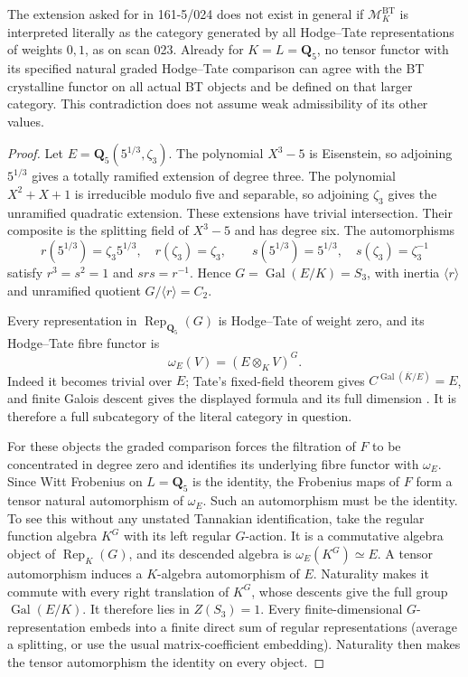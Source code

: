 \begin{theorem}\label{cat:J8}
The extension asked for in 161-5/024 does not exist in general if
$\mathcal M_K^{\mathrm{BT}}$ is interpreted literally as the category
generated by all Hodge--Tate representations of weights $0,1$, as on
scan 023.  Already for $K=L=\mathbf Q_5$, no tensor functor with its
specified natural graded Hodge--Tate comparison can agree with the
BT crystalline functor on all actual BT objects and be defined on
that larger category.  This contradiction does not assume weak
admissibility of its other values.
\end{theorem}
\begin{proof}
Let $E=\mathbf Q_5(5^{1/3},\zeta_3)$.  The polynomial $X^3-5$ is
Eisenstein, so adjoining $5^{1/3}$ gives a totally ramified extension
of degree three.  The polynomial $X^2+X+1$ is irreducible modulo five
and separable, so adjoining $\zeta_3$ gives the unramified quadratic
extension.  These extensions have trivial intersection.  Their
composite is the splitting field of $X^3-5$ and has degree six.
The automorphisms
\[
 r(5^{1/3})=\zeta_3 5^{1/3},\quad r(\zeta_3)=\zeta_3,
 \qquad
 s(5^{1/3})=5^{1/3},\quad s(\zeta_3)=\zeta_3^{-1}
\]
satisfy $r^3=s^2=1$ and $srs=r^{-1}$.  Hence
$G=\operatorname{Gal}(E/K)=S_3$, with inertia $\langle r\rangle$ and
unramified quotient $G/\langle r\rangle=C_2$.

Every representation in $\operatorname{Rep}_{\mathbf Q_5}(G)$ is
Hodge--Tate of weight zero, and its Hodge--Tate fibre functor is
\[
 \omega_E(V)=(E\otimes_KV)^G.
\]
Indeed it becomes trivial over $E$; Tate's fixed-field theorem gives
$C^{\operatorname{Gal}(\overline K/E)}=E$, and finite Galois descent
gives the displayed formula and its full dimension
\cite[main Theorem, p.~417; proof in \S3]{catAx1970}.
It is therefore a full subcategory of the literal category in question.

For these objects the graded comparison forces the filtration of $F$
to be concentrated in degree zero and identifies its underlying fibre
functor with $\omega_E$.  Since Witt Frobenius on $L=\mathbf Q_5$ is
the identity, the Frobenius maps of $F$ form a tensor natural
automorphism of $\omega_E$.
Such an automorphism must be the identity.  To see this without any
unstated Tannakian identification, take the regular function algebra
$K^G$ with its left regular $G$-action.  It is a commutative algebra
object of $\operatorname{Rep}_K(G)$, and its descended algebra is
$\omega_E(K^G)\simeq E$.  A tensor automorphism induces a $K$-algebra
automorphism of $E$.  Naturality makes it commute with every right
translation of $K^G$, whose descents give the full group
$\operatorname{Gal}(E/K)$.  It therefore lies in $Z(S_3)=1$.
Every finite-dimensional $G$-representation embeds into a finite direct
sum of regular representations (average a splitting, or use the usual
matrix-coefficient embedding).  Naturality then makes the tensor
automorphism the identity on every object.


\end{proof}
